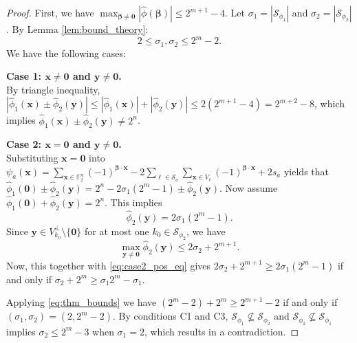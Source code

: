 \documentclass[10pt,a4paper]{amsart}
\begin{document}
\begin{proof}
First, we have $\max_{\mathbf{\beta} \neq \mathbf{0}} |\widehat{\phi}(\mathbf{\beta})| \leq 2^{m+1} - 4$. Let $\sigma_1 = |\mathcal{S}_{\phi_1}|$ and $\sigma_2 = |\mathcal{S}_{\phi_2}|$. By Lemma \ref{lem:bound_theory}:
\begin{equation}\label{eq:thm_bounds}
2 \leq \sigma_1, \sigma_2 \leq 2^m - 2.
\end{equation}
We have the following cases:

\textbf{Case 1: $\mathbf{x} \neq \mathbf{0}$ and $\mathbf{y} \neq \mathbf{0}$.} \\
By triangle inequality, $|\widehat{\phi}_1(\mathbf{x}) \pm \widehat{\phi}_2(\mathbf{y})| \leq |\widehat{\phi}_1(\mathbf{x})| + |\widehat{\phi}_2(\mathbf{y})| \leq 2(2^{m+1}-4) = 2^{m+2}-8$, which  implies $\widehat{\phi}_1(\mathbf{x}) \pm \widehat{\phi}_2(\mathbf{y}) \neq 2^n$.


\textbf{Case 2: $\mathbf{x} = \mathbf{0}$ and $\mathbf{y} \neq \mathbf{0}$.} \\
Substituting $\mathbf{x} = \mathbf{0}$ into $\psi_a(\mathbf{x})=\sum_{\mathbf{x} \in \mathbb{F}_2^n} (-1)^{\mathbf{\beta} \cdot \mathbf{x}} - 2 \sum_{\ell \in \mathcal{S}_a} \sum_{\mathbf{x} \in V_\ell} (-1)^{\mathbf{\beta} \cdot \mathbf{x}} + 2s_a$  yields
that 
$\widehat{\phi}_1(\mathbf{0}) \pm \widehat{\phi}_2(\mathbf{y}) = 2^n - 2\sigma_1(2^m - 1) \pm \widehat{\phi}_2(\mathbf{y})$.
Now assume $\widehat{\phi}_1(\mathbf{0}) + \widehat{\phi}_2(\mathbf{y}) = 2^n$. This implies
\begin{equation}\label{eq:case2_pos_eq}
\widehat{\phi}_2(\mathbf{y}) = 2\sigma_1(2^m - 1).
\end{equation}
Since $\mathbf{y} \in V_{k_0}^\perp \setminus \{\mathbf{0}\}$ for at most one $k_0 \in \mathcal{S}_{\phi_2}$, we have 
\begin{equation}
\max_{\mathbf{y} \neq \mathbf{0}} \widehat{\phi}_2(\mathbf{y}) \leq 2\sigma_2 + 2^{m+1}. 
\end{equation}
Now, this together  with \eqref{eq:case2_pos_eq} gives 
$2\sigma_2 + 2^{m+1} \geq 2\sigma_1(2^m - 1)$ if and only if $\sigma_2 + 2^m \geq \sigma_1 2^m - \sigma_1$.

Applying \eqref{eq:thm_bounds} we have $(2^m - 2) + 2^m \geq 2^{m+1} - 2$ if and only if $(\sigma_1, \sigma_2) = (2, 2^m - 2)$.  By conditions C1 and C3, $\mathcal{S}_{\phi_1} \not\subseteq \mathcal{S}_{\phi_2}$ and $\mathcal{S}_{\phi_2} \not\subseteq \mathcal{S}_{\phi_1}$ implies $\sigma_2 \leq 2^m - 3$ when $\sigma_1 = 2$, which results in a contradiction.


\end{proof}
\end{document}
